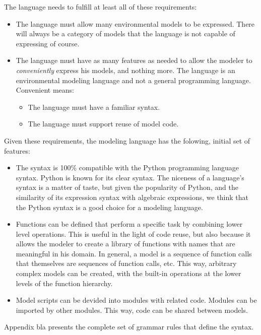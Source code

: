 \documentclass[10pt, a4paper]{article}
\begin{document}
The language needs to fulfill at least all of these requirements:

\begin{itemize}
    \item The language must allow many environmental models to be expressed. There will always be a category of models that the language is not capable of expressing of course.
    \item The language must have as many features as needed to allow the modeler to \emph{conveniently} express his models, and nothing more. The language is an environmental modeling language and not a general programming language. Convenient means:
    \begin{itemize}
        \item The language must have a familiar syntax.
        \item The language must support reuse of model code.
    \end{itemize}
\end{itemize}

Given these requirements, the modeling language has the folowing, initial set of features:

\begin{itemize}
    \item The syntax is 100\% compatible with the Python programming language syntax. Python is known for its clear syntax. The niceness of a language's syntax is a matter of taste, but given the popularity of Python, and the similarity of its expression syntax with algebraic expressions, we think that the Python syntax is a good choice for a modeling language.
    \item Functions can be defined that perform a specific task by combining lower level operations. This is useful in the light of code reuse, but also because it allows the modeler to create a library of functions with names that are meaningful in his domain. In general, a model is a sequence of function calls that themselves are sequences of function calls, etc. This way, arbitrary complex models can be created, with the built-in operations at the lower levels of the function hierarchy.
    \item Model scripts can be devided into modules with related code. Modules can be imported by other modules. This way, code can be shared between models.
\end{itemize}

Appendix bla presents the complete set of grammar rules that define the syntax.
\end{document}

